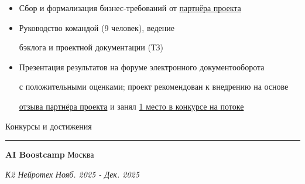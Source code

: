\documentclass[14pt, a4paper, oneside]{extarticle}
\begin{document}
\begin{itemize}
	\vspace{-2\intextsep}
    \item Сбор и формализация бизнес-требований от \href{https://vk.ru/kearkhipov}{партнёра проекта}
	\vspace{-0.8\intextsep}
    \item Руководство командой (9 человек), ведение 
    
    \vspace{-0.5\intextsep}
    бэклога и проектной документации (ТЗ)
    \vspace{-0.8\intextsep}
    \item Презентация результатов на форуме электронного документооборота
    
    \vspace{-0.5\intextsep}
    с положительными оценками; проект рекомендован к внедрению на основе
    
    \vspace{-0.5\intextsep}
 	\href{https://github.com/Crazy5202/job_application_form/tree/main/portfolio/EDMS/%D0%9E%D1%82%D0%B7%D1%8B%D0%B2_%D0%B2%D0%BD%D0%B5%D0%B4%D1%80%D0%B5%D0%BD%D0%B8%D0%B5.pdf}{отзыва партнёра проекта} и занял \href{https://github.com/Crazy5202/job_application_form/tree/main/portfolio/EDMS/%D0%9F%D0%BE%D0%B1%D0%B5%D0%B4%D0%B8%D1%82%D0%B5%D0%BB%D1%8C_%D0%A6%D0%9A.pdf}{1 место в конкурсе на потоке}
\end{itemize}


\pagebreak


\begin{flushleft}
	\vspace{-\intextsep}
	\large Конкурсы и достижения
\end{flushleft}

\vspace{-0.8\intextsep}
\hrule


\begin{flushleft}
	\vspace{-0.8\intextsep}
	\quad
	\textbf{AI Boostcamp}
	\hfill
	Москва
\end{flushleft}

\begin{flushleft}
	\vspace{-1\intextsep}
	\quad
	\textit{К2 Нейротех}
	\hfill
	\textit{\small Нояб. 2025 - Дек. 2025}
\end{flushleft}
\end{document}
